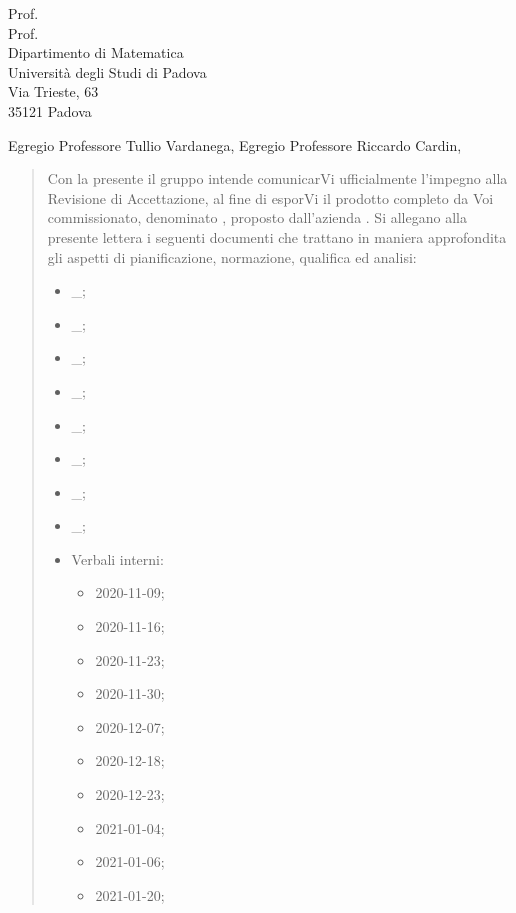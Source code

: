 \documentclass[a4paper,12pt]{letteracdp}
\date{27 maggio 2021}
\begin{document}
\thispagestyle{empty}

\begin{letter}{
	Prof. \Tullio{} \\
	Prof. \Riccardo{} \\
	Dipartimento di Matematica \\
	Università degli Studi di Padova \\
	Via Trieste, 63 \\
	35121 Padova}
	
\opening{Egregio Professore Tullio Vardanega, \newline
Egregio Professore Riccardo Cardin,}

\begin{quotation}
	\noindent 
	Con la presente il gruppo \gruppo{} intende comunicarVi ufficialmente l'impegno alla Revisione di Accettazione, al fine di esporVi il prodotto completo da Voi commissionato, denominato \progetto{}, proposto dall’azienda \proponente.\newline
	Si allegano alla presente lettera i seguenti documenti che trattano in maniera approfondita gli aspetti di pianificazione, normazione, qualifica ed analisi:
	\begin{itemize}
		\item \docAdR{}\_\versAdR;
		\item \docG{}\_\versGlo;
		\item \docNdP{}\_\versNdP;
		\item \docPdP{}\_\versPdP;
		\item \docPdQ{}\_\versPdQ;
		\item \docMU{}\_\versMU;
		\item \docMS{}\_\versMS;
		\item \docSdF{}\_\versSdF;
		\item Verbali interni:
		\begin{itemize}
			\item \docVI{}2020-11-09;
			\item \docVI{}2020-11-16;
			\item \docVI{}2020-11-23;
			\item \docVI{}2020-11-30;
			\item \docVI{}2020-12-07;
			\item \docVI{}2020-12-18;
			\item \docVI{}2020-12-23;
			\item \docVI{}2021-01-04;
			\item \docVI{}2021-01-06;
			\item \docVI{}2021-01-20;

\end{itemize}
\end{itemize}
\end{quotation}
\end{letter}
\end{document}
